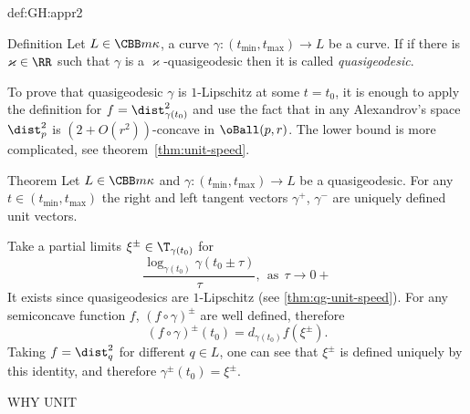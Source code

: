 {\begin{subthm}{def:GH:appr2}
\begin{thm}{Definition} Let $L\in\CBB m\kappa$, a curve $\gamma:(t_{\min},t_{\max})\to L$ be a curve.
If  if there is $\varkappa\in\RR$ such that $\gamma$ is a $\varkappa$-quasigeodesic then it is called \emph{quasigeodesic}.
\end{thm}















To prove that quasigeodesic $\gamma$ is $1$-Lipschitz at some $t=t_0$,
it is enough to apply the definition for $f=\dist_{\gamma(t_0)}^2$ and use the fact
that in any Alexandrov's space $\dist_p^2$ is $(2+O(r^2))$-concave in
$\oBall(p,r)$.
The lower bound is more complicated, see theorem~\ref{thm:unit-speed}.
\qeds


















\begin{thm}{Theorem}
Let $L\in\CBB m\kappa$ and $\gamma:(t_{\min},t_{\max})\to L$ be a quasigeodesic.
For any $t\in (t_{\min},t_{\max})$ the right and left tangent vectors $\gamma^+$,
$\gamma^-$ are uniquely defined unit vectors.
\end{thm}

Take a partial limits $\xi^\pm\in \T_{\gamma(t_0)}$ for
$$\frac{\log_{\gamma(t_0)}\gamma(t_0\pm\tau)}{\tau},\ \ \text{as}\ \ 
\tau\to0+$$
It exists since quasigeodesics are $1$-Lipschitz (see \ref{thm:qg-unit-speed}).
For any semiconcave function $f$,  $(f\circ\gamma)^\pm$ are well defined,
therefore 
$$(f\circ\gamma)^\pm(t_0)=d_{\gamma(t_0)}f(\xi^\pm).$$
Taking $f=\dist_q^2$ for different $q\in L$, one can see that $\xi^\pm$ is
defined uniquely by this identity, and therefore $\gamma^\pm(t_0)=\xi^\pm$.

WHY UNIT
\qeds




















\end{subthm}}
